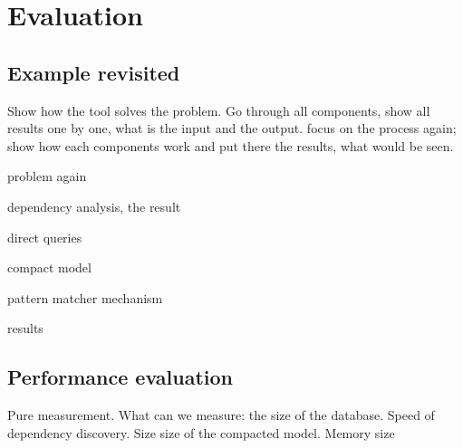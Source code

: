 \chapter{Evaluation}

\section{Example revisited}
Show how the tool solves the problem. Go through all components, show all
results one by one, what is the input and the output.
focus on the process again; show how each components work and put there the results, what would be seen.

problem again

dependency analysis, the result

direct queries

compact model

pattern matcher mechanism

results



\section{Performance evaluation}
Pure measurement. What can we measure:
the size of the database.
Speed of dependency discovery.
Size size of the compacted model. 
Memory size

